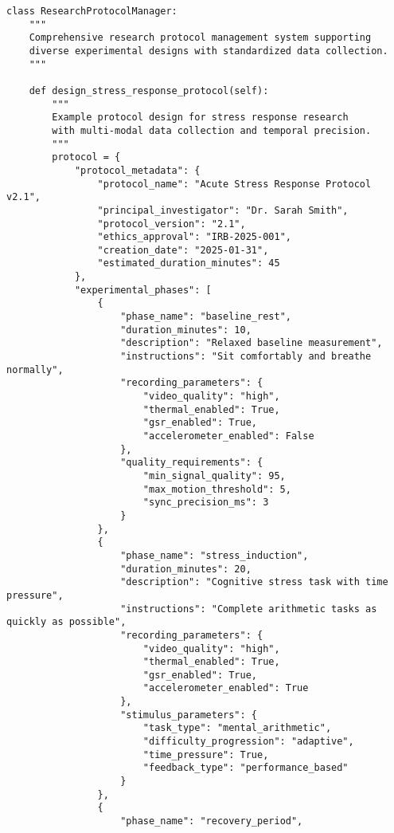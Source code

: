\documentclass[12pt,a4paper]{article}
\begin{document}
\begin{verbatim}
class ResearchProtocolManager:
    """
    Comprehensive research protocol management system supporting
    diverse experimental designs with standardized data collection.
    """
    
    def design_stress_response_protocol(self):
        """
        Example protocol design for stress response research
        with multi-modal data collection and temporal precision.
        """
        protocol = {
            "protocol_metadata": {
                "protocol_name": "Acute Stress Response Protocol v2.1",
                "principal_investigator": "Dr. Sarah Smith",
                "protocol_version": "2.1",
                "ethics_approval": "IRB-2025-001",
                "creation_date": "2025-01-31",
                "estimated_duration_minutes": 45
            },
            "experimental_phases": [
                {
                    "phase_name": "baseline_rest",
                    "duration_minutes": 10,
                    "description": "Relaxed baseline measurement",
                    "instructions": "Sit comfortably and breathe normally",
                    "recording_parameters": {
                        "video_quality": "high",
                        "thermal_enabled": True,
                        "gsr_enabled": True,
                        "accelerometer_enabled": False
                    },
                    "quality_requirements": {
                        "min_signal_quality": 95,
                        "max_motion_threshold": 5,
                        "sync_precision_ms": 3
                    }
                },
                {
                    "phase_name": "stress_induction",
                    "duration_minutes": 20,
                    "description": "Cognitive stress task with time pressure",
                    "instructions": "Complete arithmetic tasks as quickly as possible",
                    "recording_parameters": {
                        "video_quality": "high",
                        "thermal_enabled": True,
                        "gsr_enabled": True,
                        "accelerometer_enabled": True
                    },
                    "stimulus_parameters": {
                        "task_type": "mental_arithmetic",
                        "difficulty_progression": "adaptive",
                        "time_pressure": True,
                        "feedback_type": "performance_based"
                    }
                },
                {
                    "phase_name": "recovery_period",

\end{verbatim}
\end{document}
